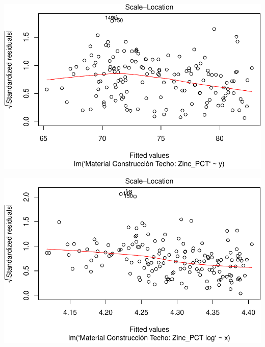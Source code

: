 \documentclass[11pt,]{article}
\newenvironment{Shaded}{\begin{snugshade}}{\end{snugshade}}
\newcommand{\KeywordTok}[1]{\textcolor[rgb]{0.13,0.29,0.53}{\textbf{#1}}}
\newcommand{\DataTypeTok}[1]{\textcolor[rgb]{0.13,0.29,0.53}{#1}}
\newcommand{\DecValTok}[1]{\textcolor[rgb]{0.00,0.00,0.81}{#1}}
\newcommand{\StringTok}[1]{\textcolor[rgb]{0.31,0.60,0.02}{#1}}
\newcommand{\OperatorTok}[1]{\textcolor[rgb]{0.81,0.36,0.00}{\textbf{#1}}}
\newcommand{\NormalTok}[1]{#1}
\begin{document}
\includegraphics{proyecto_files/figure-latex/unnamed-chunk-2-11.pdf}

\begin{Shaded}
\end{Shaded}

\includegraphics{proyecto_files/figure-latex/unnamed-chunk-2-12.pdf}

\begin{Shaded}
\end{Shaded}
\end{document}
